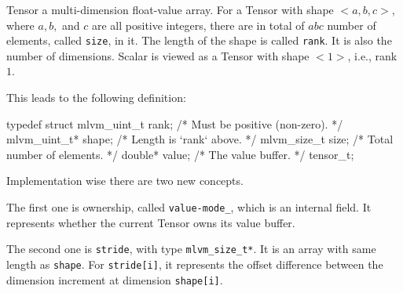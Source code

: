 
\baselineskip

Tensor a multi-dimension float-value array. For a Tensor with shape $<a, b, c>$,
where $a,b,$ and $c$ are all positive integers, there are in total of $ a b c $
number of elements, called {\tt size}, in it. The length of the shape is called
{\tt rank}. It is also the number of dimensions. Scalar is viewed as a Tensor
with shape $<1>$, i.e., rank $1$.

This leads to the following definition:

\begtt
typedef struct {
  mlvm_uint_t  rank;   /* Must be positive (non-zero). */
  mlvm_uint_t* shape;  /* Length is `rank` above. */
  mlvm_size_t  size;   /* Total number of elements. */
  double*      value;  /* The value buffer. */
} tensor_t;
\endtt

Implementation wise there are two new concepts.

{\narrower
\noindent\dag\quad The first one is ownership, called {\tt value-mode\_}, which
is an internal field. It represents whether the current Tensor owns its value
buffer.

\noindent\dag\quad The second one is {\tt stride}, with type {\tt mlvm\_size\_t*}.
It is an array with same length as {\tt shape}. For {\tt stride[i]}, it
represents the offset difference between the dimension increment at dimension
{\tt shape[i]}.
\par}

\bye
